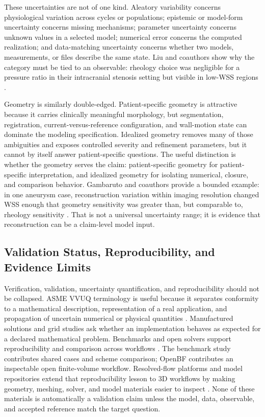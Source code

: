 These uncertainties are not of one kind. Aleatory variability concerns
physiological variation across cycles or populations; epistemic or model-form
uncertainty concerns missing mechanisms; parameter uncertainty concerns unknown
values in a selected model; numerical error concerns the computed realization;
and data-matching uncertainty concerns whether two models, measurements, or
files describe the same state. Liu and coauthors show why the category must be
tied to an observable: rheology choice was negligible for a pressure ratio in
their intracranial stenosis setting but visible in low-WSS regions
\cite{LiuEtAl2021ICASRheology}.

Geometry is similarly double-edged. Patient-specific geometry is attractive
because it carries clinically meaningful morphology, but segmentation,
registration, current-versus-reference configuration, and wall-motion state can
dominate the modeling specification. Idealized geometry removes many of those
ambiguities and exposes controlled severity and refinement parameters, but it
cannot by itself answer patient-specific questions. The useful distinction is
whether the geometry serves the claim:
patient-specific geometry for patient-specific interpretation, and idealized
geometry for isolating numerical, closure, and comparison behavior. Gambaruto
and coauthors provide a bounded example: in one aneurysm case, reconstruction
variation within imaging resolution changed WSS enough that geometry
sensitivity was greater than, but comparable to, rheology sensitivity
\cite{GambarutoEtAl2011GeometryRheologySensitivity}. That is not a universal
uncertainty range; it is evidence that reconstruction can be a claim-level
model input.

\subsection{Validation Status, Reproducibility, and Evidence Limits}
\label{subsec:synthesis-consistency-verification-validation}

Verification, validation, uncertainty quantification, and reproducibility
should not be collapsed. ASME VVUQ terminology is useful because it separates
conformity to a mathematical description, representation of a real application,
and propagation of uncertain numerical or physical quantities
\cite{ASME2022VVUQTerminology}. Manufactured solutions and grid studies ask
whether an implementation behaves as expected for a declared mathematical
problem. Benchmarks and open solvers
support reproducibility and comparison across workflows
\cite{BoileauEtAl2015Benchmark,BenemeritoEtAl2024OpenBF}. The benchmark study
contributes shared cases and scheme comparison; OpenBF contributes an
inspectable open finite-volume workflow. Resolved-flow platforms and model
repositories extend that reproducibility lesson to 3D workflows by making
geometry, meshing, solver, and model materials easier to inspect
\cite{SimVascular2026Platform,SimVascular2026VascularModelRepository}. None of
these materials is automatically a validation claim unless the model, data,
observable, and accepted reference match the target question.

